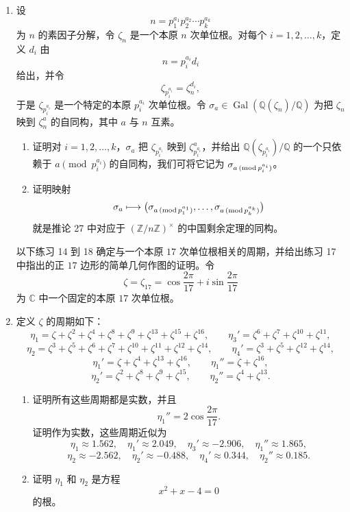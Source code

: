\begin{enumerate}[label=\arabic*.]
\item 设
\[
n=p_1^{a_1}p_2^{a_2}\cdots p_k^{a_k}
\]
为 $n$ 的素因子分解，令 $\zeta_n$ 是一个本原 $n$ 次单位根。对每个 $i=1,2,\ldots,k$，定义 $d_i$ 由
\[
n=p_i^{a_i}d_i
\]
给出，并令
\[
\zeta_{p_i^{a_i}}=\zeta_n^{d_i},
\]
于是 $\zeta_{p_i^{a_i}}$ 是一个特定的本原 $p_i^{a_i}$ 次单位根。令 $\sigma_a\in\operatorname{Gal}(\mathbb Q(\zeta_n)/\mathbb Q)$ 为把 $\zeta_n$ 映到 $\zeta_n^a$ 的自同构，其中 $a$ 与 $n$ 互素。
\begin{enumerate}[label=(\alph*)]
\item 证明对 $i=1,2,\ldots,k$，$\sigma_a$ 把 $\zeta_{p_i^{a_i}}$ 映到 $\zeta_{p_i^{a_i}}^a$，并给出 $\mathbb Q(\zeta_{p_i^{a_i}})/\mathbb Q$ 的一个只依赖于 $a\pmod {p_i^{a_i}}$ 的自同构，我们可将它记为 $\sigma_{a\,({\rm mod}\,p_i^{a_i})}$。

\item 证明映射
\[
\sigma_a\longmapsto
\bigl(\sigma_{a\,({\rm mod}\,p_1^{a_1})},\ldots,
\sigma_{a\,({\rm mod}\,p_k^{a_k})}\bigr)
\]
就是推论 27 中对应于 $(\mathbb Z/n\mathbb Z)^\times$ 的中国剩余定理的同构。
\end{enumerate}

以下练习 14 到 18 确定与一个本原 $17$ 次单位根相关的周期，并给出练习 17 中指出的正 $17$ 边形的简单几何作图的证明。令
\[
\zeta=\zeta_{17}=\cos\frac{2\pi}{17}+i\sin\frac{2\pi}{17}
\]
为 $\mathbb C$ 中一个固定的本原 $17$ 次单位根。

\item 定义 $\zeta$ 的周期如下：
\[
\eta_1=\zeta+\zeta^2+\zeta^4+\zeta^8+\zeta^9+\zeta^{13}+\zeta^{15}+\zeta^{16},
\qquad
\eta_3'=\zeta^6+\zeta^7+\zeta^{10}+\zeta^{11},
\]
\[
\eta_2=\zeta^3+\zeta^5+\zeta^6+\zeta^7+\zeta^{10}+\zeta^{11}+\zeta^{12}+\zeta^{14},
\qquad
\eta_4'=\zeta^3+\zeta^5+\zeta^{12}+\zeta^{14},
\]
\[
\eta_1'=\zeta+\zeta^4+\zeta^{13}+\zeta^{16},
\qquad
\eta_1''=\zeta+\zeta^{16},
\]
\[
\eta_2'=\zeta^2+\zeta^8+\zeta^9+\zeta^{15},
\qquad
\eta_2''=\zeta^4+\zeta^{13}.
\]
\begin{enumerate}[label=(\alph*)]
\item 证明所有这些周期都是实数，并且
\[
\eta_1''=2\cos\frac{2\pi}{17}.
\]
证明作为实数，这些周期近似为
\[
\eta_1\approx 1.562,
\quad
\eta_1'\approx 2.049,
\quad
\eta_3'\approx -2.906,
\quad
\eta_1''\approx 1.865,
\]
\[
\eta_2\approx -2.562,
\quad
\eta_2'\approx -0.488,
\quad
\eta_4'\approx 0.344,
\quad
\eta_2''\approx 0.185.
\]

\item 证明 $\eta_1$ 和 $\eta_2$ 是方程
\[
x^2+x-4=0
\]
的根。


\end{enumerate}
\end{enumerate}
